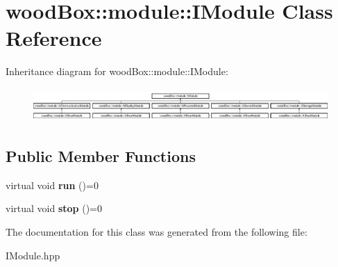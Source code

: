 \hypertarget{classwood_box_1_1module_1_1_i_module}{}\section{wood\+Box\+:\+:module\+:\+:I\+Module Class Reference}
\label{classwood_box_1_1module_1_1_i_module}
Inheritance diagram for wood\+Box\+:\+:module\+:\+:I\+Module\+:\begin{figure}[H]
\begin{center}
\leavevmode
\includegraphics[height=1.297297cm]{classwood_box_1_1module_1_1_i_module}
\end{center}
\end{figure}
\subsection*{Public Member Functions}
\begin{DoxyCompactItemize}
\item 
\mbox{\label{classwood_box_1_1module_1_1_i_module_a01228121e79242942fc365060b3a9ab9}} 
virtual void {\bfseries run} ()=0
\item 
\mbox{\label{classwood_box_1_1module_1_1_i_module_a32bdfa5bcdd901598c617587869cbec3}} 
virtual void {\bfseries stop} ()=0
\end{DoxyCompactItemize}


The documentation for this class was generated from the following file\+:\begin{DoxyCompactItemize}
\item 
I\+Module.\+hpp\end{DoxyCompactItemize}
